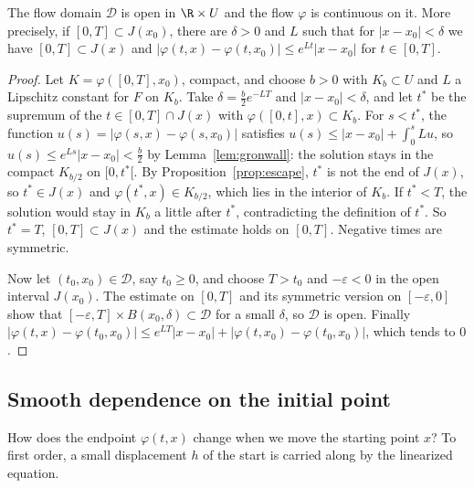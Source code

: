 \begin{theorem}\label{thm:flowcont}
The flow domain $\mathcal D$ is open in $\R\times U$ and the flow $\varphi$ is continuous on it. More precisely, if $[0,T]\subset J(x_0)$, there are
$\delta>0$ and $L$ such that for $|x-x_0|<\delta$ we have $[0,T]\subset J(x)$ and $|\varphi(t,x)-\varphi(t,x_0)|\le e^{Lt}|x-x_0|$ for $t\in[0,T]$.
\end{theorem}
\begin{proof}
Let $K=\varphi([0,T],x_0)$, compact, and choose $b>0$ with $K_b\subset U$ and $L$ a Lipschitz constant for $F$ on $K_b$. Take
$\delta=\frac b2e^{-LT}$ and $|x-x_0|<\delta$, and let $t^*$ be the supremum of the $t\in[0,T]\cap J(x)$ with $\varphi([0,t],x)\subset K_b$. For $s<t^*$, the
function $u(s)=|\varphi(s,x)-\varphi(s,x_0)|$ satisfies $u(s)\le|x-x_0|+\int_0^sLu$, so $u(s)\le e^{Ls}|x-x_0|<\frac b2$ by Lemma~\ref{lem:gronwall}: the solution
stays in the compact $K_{b/2}$ on $[0,t^*[$. By Proposition~\ref{prop:escape}, $t^*$ is not the end of $J(x)$, so $t^*\in J(x)$ and $\varphi(t^*,x)\in K_{b/2}$, which lies
in the interior of $K_b$. If $t^*<T$, the solution would stay in $K_b$ a little after $t^*$, contradicting the definition of $t^*$. So $t^*=T$, $[0,T]\subset J(x)$
and the estimate holds on $[0,T]$. Negative times are symmetric.

Now let $(t_0,x_0)\in\mathcal D$, say $t_0\ge0$, and choose $T>t_0$ and $-\varepsilon<0$ in the open interval $J(x_0)$. The estimate on $[0,T]$ and its
symmetric version on $[-\varepsilon,0]$ show that $[-\varepsilon,T]\times B(x_0,\delta)\subset\mathcal D$ for a small $\delta$, so $\mathcal D$ is open. Finally
$|\varphi(t,x)-\varphi(t_0,x_0)|\le e^{LT}|x-x_0|+|\varphi(t,x_0)-\varphi(t_0,x_0)|$, which tends to $0$.
\end{proof}

\subsection*{Smooth dependence on the initial point}

How does the endpoint $\varphi(t,x)$ change when we move the starting point $x$? To first order, a small displacement $h$ of the start is carried along by
the linearized equation.

